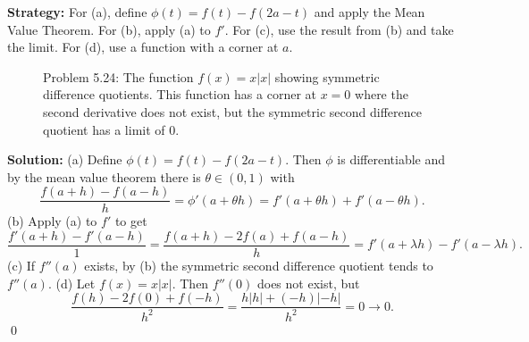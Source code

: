 \noindent\textbf{Strategy:} For (a), define \( \phi(t) = f(t) - f(2a - t) \) and apply the Mean Value Theorem. For (b), apply (a) to \( f' \). For (c), use the result from (b) and take the limit. For (d), use a function with a corner at \( a \).

\begin{figure}[h]
\centering
{}
\caption{Problem 5.24: The function $f(x) = x|x|$ showing symmetric difference quotients. This function has a corner at $x=0$ where the second derivative does not exist, but the symmetric second difference quotient has a limit of 0.}
\end{figure}

\bigskip\noindent\textbf{Solution:}
(a) Define $\phi(t)=f(t)-f(2a-t)$. Then $\phi$ is differentiable and by the mean value theorem there is $\theta\in(0,1)$ with
\[\frac{f(a+h)-f(a-h)}{h}=\phi'(a+\theta h)=f'(a+\theta h)+f'(a-\theta h).\]
(b) Apply (a) to $f'$ to get
\[\frac{f'(a+h)-f'(a-h)}{1}=\frac{f(a+h)-2f(a)+f(a-h)}{h}=f'(a+\lambda h)-f'(a-\lambda h).\]
(c) If $f''(a)$ exists, by (b) the symmetric second difference quotient tends to $f''(a)$. (d) Let $f(x)=x|x|$. Then $f''(0)$ does not exist, but
\[\frac{f(h)-2f(0)+f(-h)}{h^2}=\frac{h|h|+(-h)|-h|}{h^2}=0\to 0.\]\qed


